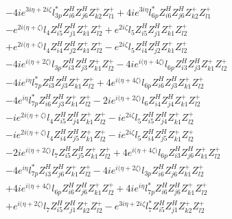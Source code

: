 \begin{align}
 &-4 i e^{3 i \eta +2 i \zeta } l_{3p}^* Z_{{i 6}}^{H} Z_{{j 6}}^{H} Z_{{k 2}}^{+} Z_{{l 1}}^{+} +4 i e^{3 i \eta } l_{6p}^* Z_{{i 6}}^{H} Z_{{j 6}}^{H} Z_{{k 2}}^{+} Z_{{l 1}}^{+} \nonumber \\ 
 &- e^{2 i \Big(\eta +\zeta \Big)} l_4 Z_{{i 5}}^{H} Z_{{j 1}}^{H} Z_{{k 1}}^{+} Z_{{l 2}}^{+} +e^{2 i \zeta } l_5 Z_{{i 5}}^{H} Z_{{j 1}}^{H} Z_{{k 1}}^{+} Z_{{l 2}}^{+} \nonumber \\ 
 &+e^{2 i \Big(\eta +\zeta \Big)} l_4 Z_{{i 4}}^{H} Z_{{j 2}}^{H} Z_{{k 1}}^{+} Z_{{l 2}}^{+} - e^{2 i \zeta } l_5 Z_{{i 4}}^{H} Z_{{j 2}}^{H} Z_{{k 1}}^{+} Z_{{l 2}}^{+} \nonumber \\ 
 &-4 i e^{i \Big(\eta +2 \zeta \Big)} l_{3p} Z_{{i 3}}^{H} Z_{{j 3}}^{H} Z_{{k 1}}^{+} Z_{{l 2}}^{+} -4 i e^{i \Big(\eta +4 \zeta \Big)} l_{6p} Z_{{i 3}}^{H} Z_{{j 3}}^{H} Z_{{k 1}}^{+} Z_{{l 2}}^{+} \nonumber \\ 
 &-4 i e^{i \eta } l_{7p}^* Z_{{i 3}}^{H} Z_{{j 3}}^{H} Z_{{k 1}}^{+} Z_{{l 2}}^{+} +4 e^{i \Big(\eta +4 \zeta \Big)} l_{6p} Z_{{i 6}}^{H} Z_{{j 3}}^{H} Z_{{k 1}}^{+} Z_{{l 2}}^{+} \nonumber \\ 
 &-4 e^{i \eta } l_{7p}^* Z_{{i 6}}^{H} Z_{{j 3}}^{H} Z_{{k 1}}^{+} Z_{{l 2}}^{+} -2 i e^{i \Big(\eta +2 \zeta \Big)} l_6 Z_{{i 4}}^{H} Z_{{j 4}}^{H} Z_{{k 1}}^{+} Z_{{l 2}}^{+} \nonumber \\ 
 &-i e^{2 i \Big(\eta +\zeta \Big)} l_4 Z_{{i 5}}^{H} Z_{{j 4}}^{H} Z_{{k 1}}^{+} Z_{{l 2}}^{+} -i e^{2 i \zeta } l_5 Z_{{i 5}}^{H} Z_{{j 4}}^{H} Z_{{k 1}}^{+} Z_{{l 2}}^{+} \nonumber \\ 
 &-i e^{2 i \Big(\eta +\zeta \Big)} l_4 Z_{{i 4}}^{H} Z_{{j 5}}^{H} Z_{{k 1}}^{+} Z_{{l 2}}^{+} -i e^{2 i \zeta } l_5 Z_{{i 4}}^{H} Z_{{j 5}}^{H} Z_{{k 1}}^{+} Z_{{l 2}}^{+} \nonumber \\ 
 &-2 i e^{i \Big(\eta +2 \zeta \Big)} l_7 Z_{{i 5}}^{H} Z_{{j 5}}^{H} Z_{{k 1}}^{+} Z_{{l 2}}^{+} +4 e^{i \Big(\eta +4 \zeta \Big)} l_{6p} Z_{{i 3}}^{H} Z_{{j 6}}^{H} Z_{{k 1}}^{+} Z_{{l 2}}^{+} \nonumber \\ 
 &-4 e^{i \eta } l_{7p}^* Z_{{i 3}}^{H} Z_{{j 6}}^{H} Z_{{k 1}}^{+} Z_{{l 2}}^{+} -4 i e^{i \Big(\eta +2 \zeta \Big)} l_{3p} Z_{{i 6}}^{H} Z_{{j 6}}^{H} Z_{{k 1}}^{+} Z_{{l 2}}^{+} \nonumber \\ 
 &+4 i e^{i \Big(\eta +4 \zeta \Big)} l_{6p} Z_{{i 6}}^{H} Z_{{j 6}}^{H} Z_{{k 1}}^{+} Z_{{l 2}}^{+} +4 i e^{i \eta } l_{7p}^* Z_{{i 6}}^{H} Z_{{j 6}}^{H} Z_{{k 1}}^{+} Z_{{l 2}}^{+} \nonumber \\ 
 &+e^{i \Big(\eta +2 \zeta \Big)} l_7 Z_{{i 5}}^{H} Z_{{j 1}}^{H} Z_{{k 2}}^{+} Z_{{l 2}}^{+} - e^{3 i \eta +2 i \zeta } l_7^* Z_{{i 5}}^{H} Z_{{j 1}}^{H} Z_{{k 2}}^{+} Z_{{l 2}}^{+} \nonumber \\ 

\end{align}
